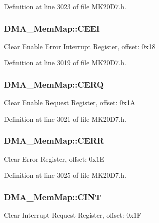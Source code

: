 Definition at line 3023 of file M\+K20\+D7.\+h.

\subsubsection[{\texorpdfstring{C\+E\+EI}{CEEI}}]{ D\+M\+A\+\_\+\+Mem\+Map\+::\+C\+E\+EI}\hypertarget{struct_d_m_a___mem_map_a02b835eb33ce21b8b3170304a72fccc2}{}\label{struct_d_m_a___mem_map_a02b835eb33ce21b8b3170304a72fccc2}
Clear Enable Error Interrupt Register, offset\+: 0x18 

Definition at line 3019 of file M\+K20\+D7.\+h.

\subsubsection[{\texorpdfstring{C\+E\+RQ}{CERQ}}]{ D\+M\+A\+\_\+\+Mem\+Map\+::\+C\+E\+RQ}\hypertarget{struct_d_m_a___mem_map_a1e78a98a5a2aca80d229f7c055dc9ff1}{}\label{struct_d_m_a___mem_map_a1e78a98a5a2aca80d229f7c055dc9ff1}
Clear Enable Request Register, offset\+: 0x1A 

Definition at line 3021 of file M\+K20\+D7.\+h.

\subsubsection[{\texorpdfstring{C\+E\+RR}{CERR}}]{ D\+M\+A\+\_\+\+Mem\+Map\+::\+C\+E\+RR}\hypertarget{struct_d_m_a___mem_map_acb163ebc8fa00a1bdc82b3e8324d4b23}{}\label{struct_d_m_a___mem_map_acb163ebc8fa00a1bdc82b3e8324d4b23}
Clear Error Register, offset\+: 0x1E 

Definition at line 3025 of file M\+K20\+D7.\+h.

\subsubsection[{\texorpdfstring{C\+I\+NT}{CINT}}]{ D\+M\+A\+\_\+\+Mem\+Map\+::\+C\+I\+NT}\hypertarget{struct_d_m_a___mem_map_a1a3708788fc9260a7392a51485629884}{}\label{struct_d_m_a___mem_map_a1a3708788fc9260a7392a51485629884}
Clear Interrupt Request Register, offset\+: 0x1F 


